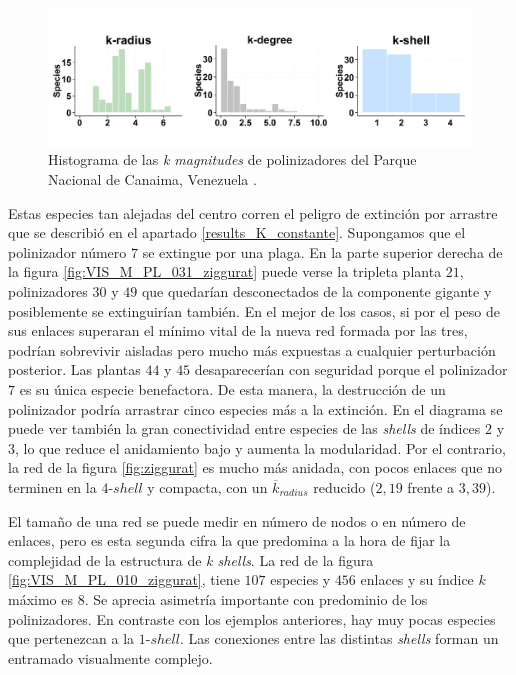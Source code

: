 \begin{figure}[ht!]
\centering
\includegraphics[scale=0.5]{Figures/VIS_M_PL_031_polar.png}
\caption {Histograma de las \textit{k magnitudes} de polinizadores del Parque Nacional de Canaima, Venezuela \cite{ramirez1989biologia}.}
\label{fig:VIS_M_PL_031_polar}
\end{figure}

Estas especies tan alejadas del centro corren el peligro de extinción por arrastre que se describió en el apartado \ref{results_K_constante}. Supongamos que el polinizador número $7$ se extingue por una plaga. En la parte superior derecha de la figura \ref{fig:VIS_M_PL_031_ziggurat} puede verse la tripleta planta $21$, polinizadores $30$ y $49$ que quedarían desconectados de la componente gigante y posiblemente se extinguirían también. En el mejor de los casos, si por el peso de sus enlaces superaran el mínimo vital de la nueva red formada por las tres, podrían sobrevivir aisladas pero mucho más expuestas a cualquier perturbación posterior. Las plantas $44$ y $45$ desaparecerían con seguridad porque el polinizador $7$ es su única especie benefactora. De esta manera, la destrucción de un polinizador podría arrastrar cinco especies más a la extinción. En el diagrama se puede ver también la gran conectividad entre especies de las \textit{shells} de índices $2$ y $3$, lo que reduce el anidamiento bajo y aumenta la modularidad. Por el contrario, la red de la figura \ref{fig:ziggurat} es mucho más anidada, con pocos enlaces que no terminen en la $4$-$shell$ y compacta, con un $\overline k_{radius}$ reducido ($2,19$ frente a $3,39$).


El tamaño de una red se puede medir en número de nodos o en número de enlaces, pero es esta segunda cifra la que predomina a la hora de fijar la complejidad de la estructura de \textit{k shells}. La red de la figura \ref{fig:VIS_M_PL_010_ziggurat}, tiene $107$ especies y $456$ enlaces y su índice $k$ máximo es $8$. Se aprecia asimetría importante con predominio de los polinizadores. En contraste con los ejemplos anteriores, hay muy pocas especies que pertenezcan a la $1$-$shell$. Las conexiones entre las distintas \textit{shells} forman un entramado visualmente complejo.

